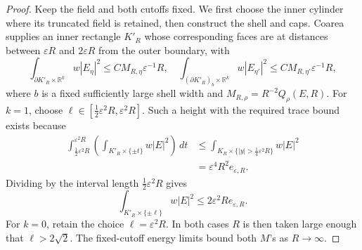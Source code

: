 \begin{proof}
Keep the field and both cutoffs fixed. We first choose the inner cylinder
where its truncated field is retained, then construct the shell and caps.
Coarea supplies an inner rectangle $K'_R$ whose corresponding faces
are at distances between $\varepsilon R$ and $2\varepsilon R$ from
the outer boundary, with
\[
 \int_{\partial K'_R\times\mathbb R^k}w|E_\eta|^2
       \le C M_{R,\eta}\varepsilon^{-1}R,
 \quad
 \int_{(\partial K'_R)_b\times\mathbb R^k}w|E_{\eta'}|^2
       \le C M_{R,\eta'}\varepsilon^{-1}R,
\]
where $b$ is a fixed sufficiently large shell width and
$M_{R,\rho}=R^{-2}Q_\rho(E,R)$.
For $k=1$, choose
$\ell\in[\frac12\varepsilon^2R,\varepsilon^2R]$.
Such a height with the required trace bound exists because
\begin{align*}
 \int_{\frac12\varepsilon^2R}^{\varepsilon^2R}
   \left(\int_{K'_R\times\{\pm t\}}w|E|^2\right)\,dt
 &\le \int_{K_R\times\{|y|>\frac14\varepsilon^2R\}}w|E|^2\\
 &=\varepsilon^4R^2e_{\varepsilon,R}.
\end{align*}
Dividing by the interval length $\frac12\varepsilon^2R$ gives
\[
 \int_{K'_R\times\{\pm\ell\}}w|E|^2
                    \le2\varepsilon^2R e_{\varepsilon,R}.
\]
For $k=0$, retain the choice $\ell=\varepsilon^2R$.
In both cases $R$ is then taken large enough that $\ell>2\sqrt2$.
The fixed-cutoff energy limits bound both $M$'s as $R\to\infty$.


\end{proof}
